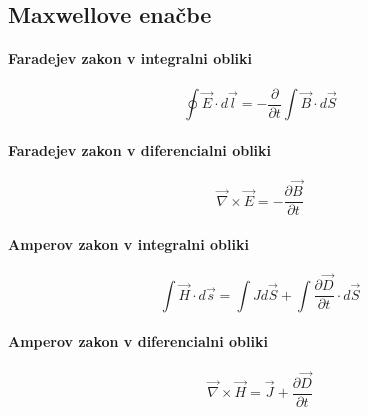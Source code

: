 \documentclass[a4paper,12pt]{article}
\begin{document}
\subsection{Maxwellove enačbe}
\begin{multicols}{2}
    \paragraph{Faradejev zakon v integralni obliki}
    \begin{equation}
        \label{eq:faradejev_zakon_integralna}
        \oint \vec{E} \cdot d\vec{l} = -\frac{\partial}{\partial t} \int \vec{B} \cdot d\vec{S}
    \end{equation}

    \paragraph{Faradejev zakon v diferencialni obliki}
    \begin{equation}
        \label{eq:faradejev_zakon_diferencialna}
        \vec{\nabla} \times \vec{E} = -\frac{\partial \vec{B}}{\partial t}
    \end{equation}

    \paragraph{Amperov zakon v integralni obliki}
    \begin{equation}
        \label{eq:amperov_zakon_integralna}
        \int \vec{H} \cdot d\vec{s} = \int J d\vec{S} + \int \frac{\partial \vec{D}}{\partial t} \cdot d\vec{S}
    \end{equation}

    \paragraph{Amperov zakon v diferencialni obliki}
    \begin{equation}
        \label{eq:amperov_zakon_diferencialna}
        \vec{\nabla} \times \vec{H} = \vec{J} + \frac{\partial \vec{D}}{\partial t}
    \end{equation}

\end{multicols}
\end{document}
